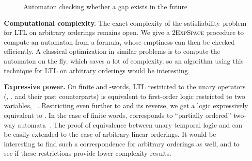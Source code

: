 \documentclass[envcountsame]{fsttcs-ps}
\newcommand{\expspace}{\textsc{ExpSpace}\xspace}
\begin{document}
\begin{figure}
\caption{Automaton checking whether a gap exists in the future}
\label{fig:gap}
\end{figure}

\noindent \textbf{Computational complexity.}  The exact complexity of the
satisfiability problem for LTL on arbitrary orderings remains open.  We give a
2\expspace procedure to compute an automaton from a formula, whose emptiness
can then be checked efficiently.  A classical optimization in similar problems
is to compute the automaton on the fly, which saves a lot of complexity, so an
algorithm using this technique for LTL on arbitrary orderings would be
interesting.

\noindent \textbf{Expressive power.}  On finite and -words, LTL
restricted to the unary operators (, , and their past
counterparts) is equivalent to first-order logic restricted to two variables,
~\cite{DBLP:journals/iandc/EtessamiVW02}.  Restricting even
further to  and its reverse, we get a logic expressively
equivalent to .  In the case of finite words,  corresponds
to ``partially ordered'' two-way automata~\cite{SchThVo2002}.  The proof of
equivalence between unary temporal logic and  can be easily extended to
the case of arbitrary linear orderings.  It would be interesting to find such
a correspondence for arbitrary orderings as well, and to see if these
restrictions provide lower complexity results.
\end{document}

